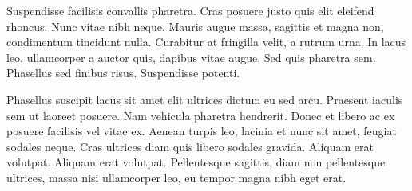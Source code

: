 Suspendisse facilisis convallis pharetra. Cras posuere justo quis elit eleifend rhoncus. Nunc vitae nibh neque. Mauris augue massa, sagittis et magna non, condimentum tincidunt nulla. Curabitur at fringilla velit, a rutrum urna. In lacus leo, ullamcorper a auctor quis, dapibus vitae augue. Sed quis pharetra sem. Phasellus sed finibus risus. Suspendisse potenti.

Phasellus suscipit lacus sit amet elit ultrices dictum eu sed arcu. Praesent iaculis sem ut laoreet posuere. Nam vehicula pharetra hendrerit. Donec et libero ac ex posuere facilisis vel vitae ex. Aenean turpis leo, lacinia et nunc sit amet, feugiat sodales neque. Cras ultrices diam quis libero sodales gravida. Aliquam erat volutpat. Aliquam erat volutpat. Pellentesque sagittis, diam non pellentesque ultrices, massa nisi ullamcorper leo, eu tempor magna nibh eget erat.